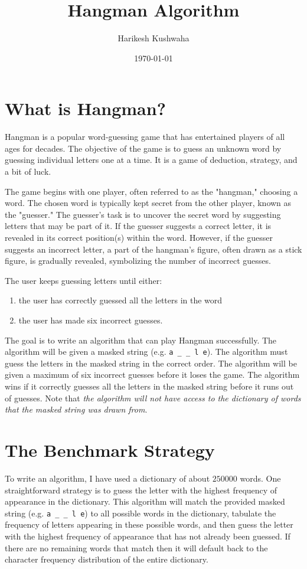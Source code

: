 \documentclass[12pt]{article}
\date{\today}
\title{Hangman Algorithm}
\author{Harikesh Kushwaha}
\begin{document}
\maketitle
\section{What is Hangman?}
Hangman is a popular word-guessing game that has entertained players of all ages for decades. The objective of the game is to guess an unknown word by guessing individual letters one at a time. It is a game of deduction, strategy, and a bit of luck.

The game begins with one player, often referred to as the "hangman," choosing a word. The chosen word is typically kept secret from the other player, known as the "guesser." The guesser's task is to uncover the secret word by suggesting letters that may be part of it. If the guesser suggests a correct letter, it is revealed in its correct position(s) within the word. However, if the guesser suggests an incorrect letter, a part of the hangman's figure, often drawn as a stick figure, is gradually revealed, symbolizing the number of incorrect guesses.

The user keeps guessing letters until either:
\begin{enumerate}
    \item the user has correctly guessed all the letters in the word
    \item the user has made six incorrect guesses.
\end{enumerate}

The goal is to write an algorithm that can play Hangman successfully. The algorithm will be given a masked string (e.g. \verb|a _ _ l e|). The algorithm must guess the letters in the masked string in the correct order. The algorithm will be given a maximum of six incorrect guesses before it loses the game. The algorithm wins if it correctly guesses all the letters in the masked string before it runs out of guesses. Note that \textit{the algorithm will not have access to the dictionary of words that the masked string was drawn from}.

\section{The Benchmark Strategy}

To write an algorithm, I have used a dictionary of about $250000$ words. One straightforward strategy is to guess the letter with the highest frequency of appearance in the dictionary. This algorithm will match the provided masked string (e.g. \verb|a _ _ l e|) to all possible words in the dictionary, tabulate the frequency of letters appearing in these possible words, and then guess the letter with the highest frequency of appearance that has not already been guessed. If there are no remaining words that match then it will default back to the character frequency distribution of the entire dictionary.
\end{document}
